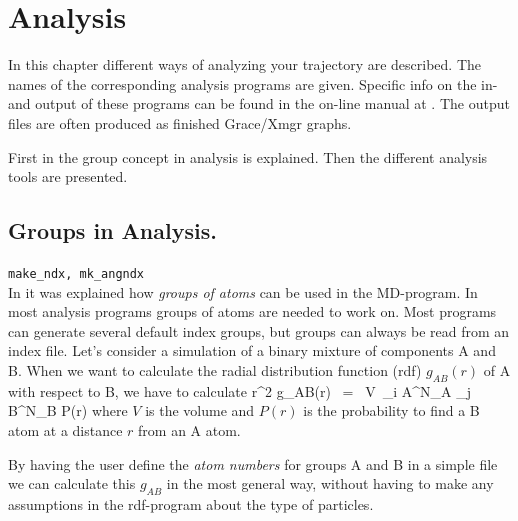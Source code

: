 %
% 
% 
% 
% 
% 
% 
% 
% 
%

\chapter{Analysis}
\label{ch:analysis}
In this chapter different ways of analyzing your trajectory are described. 
The names of the corresponding analysis programs are given. 
Specific info on the in- and output of these programs can be found 
in the on-line manual at {\wwwpage}.
The output files are often produced as finished Grace/Xmgr graphs.

First in  the group concept in analysis is explained. 
Then the different analysis tools are presented.


\section{Groups in Analysis.}
\label{sec:groups}
{\tt make\_ndx, mk\_angndx}\\
In  it was explained how {\em groups of
atoms} can be used in the MD-program.  In most analysis programs groups
of atoms are needed to work on. Most programs can generate several default
index groups, but groups can always be read from an index file. Let's
consider a simulation of a binary mixture of components A and B. When
we want to calculate the radial distribution function (rdf)
$g_{AB}(r)$ of A with respect to B, we have to calculate
\pi r^2 g_{AB}(r)      ~=~     V~\sum_{i \in A}^{N_A} \sum_{j \in B}^{N_B} P(r)
\eeq
where $V$ is the volume and $P(r)$ is the probability to find a B atom
at a distance $r$ from an A atom.

By having the user define the {\em atom numbers} for groups A and B in
a simple file we can calculate this $g_{AB}$ in the most general way, without
having to make any assumptions in the rdf-program about the type of 
particles. 

